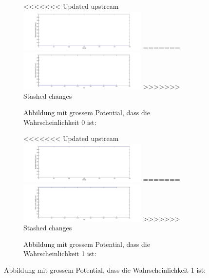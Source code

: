 \begin{refsection}
\begin{figure}
\begin{figure}
\centering
<<<<<<< Updated upstream
\includegraphics[width=0.7\textwidth]{flash/graphics/PotentialgrossZ0.pdf}
=======
\includegraphics[width=0.7\textwidth]{flash/graphics/PotentialgrossZ0.png}
>>>>>>> Stashed changes
\caption{Abbildung mit grossem Potential, dass die Wahrscheinlichkeit 0 ist:
\label{skript:PotentialgrossZ0}}
\end{figure}
\begin{figure}
\centering
<<<<<<< Updated upstream
\includegraphics[width=0.7\textwidth]{flash/graphics/PotentialgrossZ1.pdf}
=======
\includegraphics[width=0.7\textwidth]{flash/graphics/PotentialgrossZ1.png}
>>>>>>> Stashed changes
\caption{Abbildung mit grossem Potential, dass die Wahrscheinlichkeit 1 ist:
\label{skript:PotentialgrossZ1}}
\end{figure}


\end{figure}
\end{refsection}
